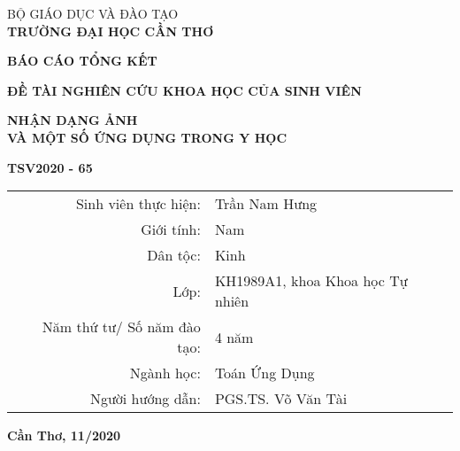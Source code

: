 \documentclass[../thesis.tex]{subfiles}
\begin{document}
\begin{titlepage}
	

\begin{center}

BỘ GIÁO DỤC VÀ ĐÀO TẠO\\
\textbf{TRƯỜNG ĐẠI HỌC CẦN THƠ\\[5cm]}


\begin{Large}{\textbf{BÁO CÁO TỔNG KẾT\\[0.1cm]}} \end{Large}
\textbf{ĐỀ TÀI NGHIÊN CỨU KHOA HỌC CỦA SINH VIÊN\\[2cm]}

\textbf{{\Large NHẬN DẠNG ẢNH\\ VÀ MỘT SỐ ỨNG DỤNG TRONG Y HỌC}}
\\[0.5cm]

\begin{large}
     \textbf{TSV2020 - 65\\[2 cm]}
\end{large}

\begin{tabular}{rl}
	Sinh viên thực hiện: & Trần Nam Hưng\\
	Giới tính:& Nam\\	
	Dân tộc: & Kinh\\
	Lớp:& KH1989A1, khoa Khoa học Tự nhiên\\
	Năm thứ tư/ Số năm đào tạo:& 4 năm \\
	Ngành học:& Toán Ứng Dụng\\
	Người hướng dẫn:& PGS.TS. Võ Văn Tài
 
	\\[2.8 cm]
\end{tabular}


\textbf{Cần Thơ, 11/2020}

\end{center}

\end{titlepage}
\end{document}
